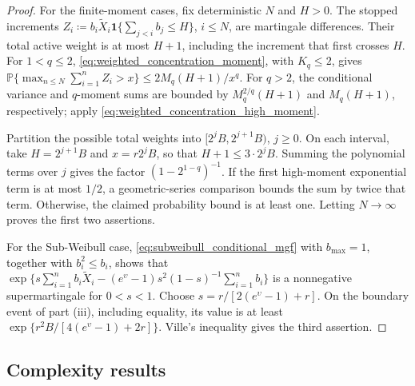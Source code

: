 \documentclass{article}
\begin{document}
\begin{proof}
For the finite-moment cases, fix deterministic \(N\) and \(H>0\).
The stopped increments
\(Z_i\coloneqq b_i\widetilde X_i\mathbf1\{\sum_{j<i}b_j\le H\}\),
\(i\le N\), are martingale differences. Their total active weight
is at most \(H+1\), including the increment that first crosses \(H\).
For \(1<q\le2\),
\eqref{eq:weighted_concentration_moment}, with \(K_q\le2\), gives
\(\mathbb P\{\max_{n\le N}\sum_{i=1}^n Z_i>x\}
\le2M_q(H+1)/x^q\).
For \(q>2\), the conditional variance and \(q\)-moment sums are
bounded by \(M_q^{2/q}(H+1)\) and \(M_q(H+1)\), respectively;
apply
\eqref{eq:weighted_concentration_high_moment}.

Partition the possible total weights into
\([2^jB,2^{j+1}B)\), \(j\ge0\). On each interval, take
\(H=2^{j+1}B\) and \(x=r2^jB\), so that \(H+1\le3\cdot2^jB\).
Summing the polynomial terms over \(j\) gives the factor
\((1-2^{1-q})^{-1}\).
If the first high-moment exponential term is at most \(1/2\), a geometric-series
comparison bounds the sum by twice that term. Otherwise, the claimed
probability bound is at least one.
Letting \(N\to\infty\) proves the first two assertions.

For the Sub-Weibull case, \eqref{eq:subweibull_conditional_mgf} with
\(b_{\max}=1\), together with \(b_i^2\le b_i\), shows that
\(\exp\{s\sum_{i=1}^n b_i\widetilde X_i
-(e^\upsilon-1)s^2(1-s)^{-1}\sum_{i=1}^n b_i\}\)
is a nonnegative supermartingale for \(0<s<1\).
Choose \(s=r/[2(e^\upsilon-1)+r]\).
On the boundary event of part \textnormal{(iii)}, including equality, its
value is at least \(\exp\{r^2B/[4(e^\upsilon-1)+2r]\}\).
Ville's inequality gives the third assertion.
\end{proof}

\subsection{Complexity results}
\end{document}
